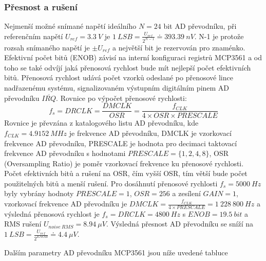 \subsubsection{Přesnost a rušení}
Nejmenší možné snímané napětí ideálního $N = 24$ bit AD převodníku, při referenčním napětí $U_{ref} = 3.3 \ V $ je $ 1 \ LSB = \frac{U_{ref}}{2^{N-1}} \doteq 393.39 \ nV$. N-1 je protože rozsah snímaného napětí je $\pm U_{ref}$ a největší bit je rezervován pro znaménko.
Efektivní počet bitů (ENOB) závisí na interní konfiguraci registrů MCP3561 a od toho se také odvíjí jaká přenosová rychlost bude mít nejlepší počet efektivních bitů. Přenosová rychlost udává počet vzorků odeslané po přenosové lince nadřazenému systému, signalizovaném výstupním digitálním pinem AD převodníku $\overline{IRQ}$.
Rovnice po výpočet přenosové rychlosti:
\begin{equation}
    f_s = DRCLK = \frac{DMCLK}{OSR} =\frac{f_{CLK}}{4 \times OSR \times PRESCALE}
\end{equation}
Rovnice je převzána z katalogového listu AD převodníku, kde $f_{CLK} = 4.9152 \ MHz$ je frekvence AD převodníku, DMCLK je vzorkovací frekvence AD převodníku, PRESCALE je hodnota pro decimaci taktovací frekvence AD převodníku s hodnotami $PRESCALE = \{1, 2, 4, 8\}$, OSR (Oversampling Ratio) je poměr vzorkovací frekvence ku přenosové rychlosti.
Počet efektivních bitů a rušení na OSR, čím vyšší OSR, tím větší bude počet použitelných bitů a menší rušení. Pro dosáhnutí přenosové rychlosti $f_s = 5000 \ Hz$ byly vybrány hodnoty $PRESCALE = 1$, $OSR = 256$ a zesílení $GAIN = 1$,
vzorkovací frekvence AD převodníku je $DMCLK = \frac{f_{CLK}}{4 \times PRESCALE} = 1 \ 228 \ 800 \ Hz$ a výsledná přenosová rychlost je $f_s = DRCLK = 4800 \ Hz$ s $ENOB = 19.5 \ bit$ a RMS rušení $U_{noise \ RMS} = 8.94 \ \mu V$.
Výsledná přesnost AD převodníku se sníží na $ 1 \ LSB = \frac{U_{ref}}{2^{ENOB}} \doteq  4.4 \ \mu V$.
\par
Dalším parametry AD převodníku MCP3561 jsou níže uvedené tabluce
